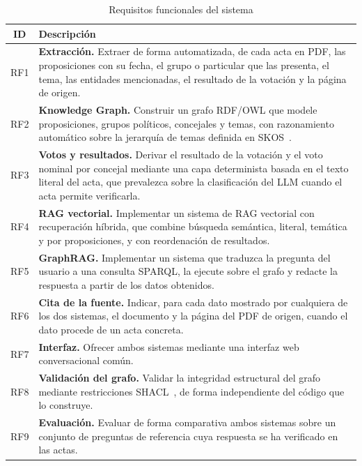 \documentclass[11pt, a4paper]{report}
\begin{document}
	\begin{table}[H]
		\centering
		\begin{tabularx}{\linewidth}{|c|X|}
			\hline
			\rowcolor{tabla-header}
			\textbf{ID} & \textbf{Descripción} \\
			\hline
			RF1 & \textbf{Extracción.} Extraer de forma automatizada, de cada acta
			en PDF, las proposiciones con su fecha, el grupo o particular que las
			presenta, el tema, las entidades mencionadas, el resultado de la
			votación y la página de origen. \\
			\hline
			\rowcolor{fila-alterna}
			RF2 & \textbf{Knowledge Graph.} Construir un grafo RDF/OWL que
			modele proposiciones, grupos políticos, concejales y temas, con
			razonamiento automático sobre la jerarquía de temas definida en SKOS~\cite{w3c-skos}.
			\\
			\hline
			RF3 & \textbf{Votos y resultados.} Derivar el resultado de la votación
			y el voto nominal por concejal mediante una capa determinista basada
			en el texto literal del acta, que prevalezca sobre la clasificación
			del LLM cuando el acta permite verificarla. \\
			\hline
			\rowcolor{fila-alterna}
			RF4 & \textbf{RAG vectorial.} Implementar un sistema de RAG vectorial
			con recuperación híbrida, que combine búsqueda semántica, literal,
			temática y por proposiciones, y con reordenación de resultados. \\
			\hline
			RF5 & \textbf{GraphRAG.} Implementar un sistema que traduzca la
			pregunta del usuario a una consulta SPARQL, la ejecute sobre el grafo
			y redacte la respuesta a partir de los datos obtenidos. \\
			\hline
			\rowcolor{fila-alterna}
			RF6 & \textbf{Cita de la fuente.} Indicar, para cada dato mostrado por
			cualquiera de los dos sistemas, el documento y la página del PDF de
			origen, cuando el dato procede de un acta concreta. \\
			\hline
			RF7 & \textbf{Interfaz.} Ofrecer ambos sistemas mediante una interfaz
			web conversacional común. \\
			\hline
			\rowcolor{fila-alterna}
			RF8 & \textbf{Validación del grafo.} Validar la integridad estructural
			del grafo mediante restricciones SHACL~\cite{w3c-shacl}, de forma independiente del
			código que lo construye. \\
			\hline
			RF9 & \textbf{Evaluación.} Evaluar de forma comparativa ambos sistemas
			sobre un conjunto de preguntas de referencia cuya respuesta se ha
			verificado en las actas. \\
			\hline
		\end{tabularx}
		\caption{Requisitos funcionales del sistema}
		\label{tab:requisitos-funcionales}
	\end{table}
\end{document}

